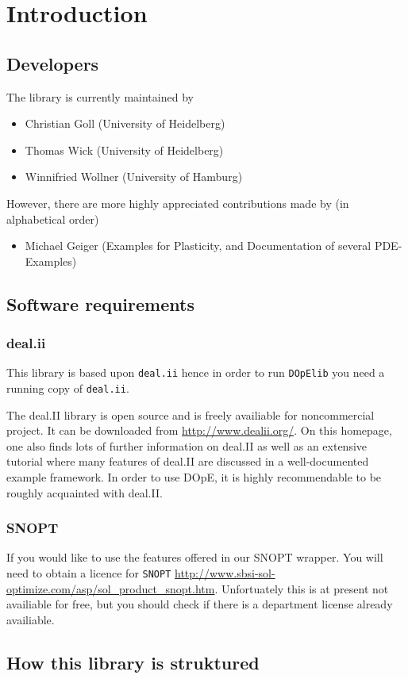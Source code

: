 \chapter{Introduction}\label{chap:intro}
\section{Developers}
The library is currently maintained by 
\begin{itemize}
  \item Christian Goll (University of Heidelberg)
  \item Thomas Wick (University of Heidelberg)
  \item Winnifried Wollner (University of Hamburg)
\end{itemize}

However, there are more highly appreciated contributions
made by (in alphabetical order)
\begin{itemize}
  \item Michael Geiger (Examples for Plasticity, and Documentation of several PDE-Examples)
\end{itemize}

\section{Software requirements}

\subsection{deal.ii}
This library is based upon {\tt deal.ii} hence in order to run 
{\tt DOpElib} you need a running copy of {\tt deal.ii}.

The deal.II library is open source and is freely availiable for noncommercial project.
It can be downloaded from \url{http://www.dealii.org/}. On this
homepage, one also finds lots of further information on deal.II as well as
an extensive tutorial where many features of deal.II are discussed in a
well-documented example framework. In order to use DOpE, it is highly
recommendable to be roughly acquainted with deal.II.

\subsection{SNOPT}
If you would like to use the features offered in our SNOPT wrapper. You will 
need to obtain a licence for {\tt SNOPT} 
\url{http://www.sbsi-sol-optimize.com/asp/sol_product_snopt.htm}.
Unfortuately this is at present not availiable for free, but you should check if 
there is a department license already availiable.

\section{How this library is struktured}

